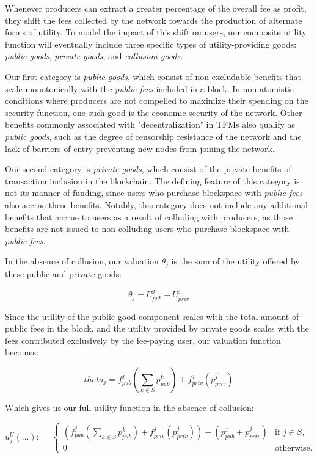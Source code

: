 \documentclass[oneside]{article}   	%
\begin{document}
Whenever producers can extract a greater percentage of the overall fee as profit, they shift the fees collected by the network towards the production of alternate forms of utility. To model the impact of this shift on users, our composite utility function will eventually include three specific types of utility-providing goods: \textit{public goods}, \textit{private goods}, and \textit{collusion goods}.

Our first category is \textit{public goods}, which consist of non-excludable benefits that scale monotonically with the \textit{public fees} included in a block. In non-atomistic conditions where producers are not compelled to maximize their spending on the security function, one such good is the economic security of the network. Other benefits commonly associated with "decentralization" in TFMs also qualify as \textit{public goods}, such as the degree of censorship resistance of the network and the lack of barriers of entry preventing new nodes from joining the network.

Our second category is \textit{private goods}, which consist of the private benefits of transaction inclusion in the blockchain. The defining feature of this category is not its manner of funding, since users who purchase blockspace with \textit{public fees} also accrue these benefits. Notably, this category does not include any additional benefits that accrue to users as a result of colluding with producers, as those benefits are not issued to non-colluding users who purchase blockspace with \textit{public fees}.

In the absence of collusion, our valuation $\theta_j$ is the sum of the utility offered by these public and private goods:

$$
\theta_j = U_{pub}^j + U_{priv}^j
$$

Since the utility of the public good component scales with the total amount of public fees in the block, and the utility provided by private goods scales with the fees contributed exclusively by the fee-paying user, our valuation function becomes:

$$
theta_j = f_{pub}^j\left(\sum_{k \in S} p_{pub}^{k}\right) + f_{priv}^j(p_{priv}^j)
$$

Which gives us our full utility function in the absence of collusion:

\[
u_j^U\left(...\right) : =
\begin{cases}
\left(
        f_{pub}^j
                \left(\sum_{k \in S} p_{pub}^{k}\right)
                + f_{priv}^j(p_{priv}^j)
\right)  -   \left(p_{pub}^j + p_{priv}^j\right) & \text{if } j \in S, \\ 0 & \text{otherwise.}
\end{cases}
\]
\end{document}
